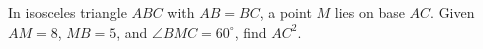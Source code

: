 In isosceles triangle $ABC$ with $AB=BC$, a point $M$ lies on base $AC$. Given $AM=8$, $MB=5$, and $\angle BMC=60^{\circ}$, find $AC^{2}$.
